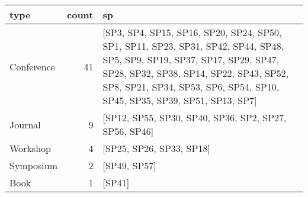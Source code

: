 \begin{tabular}{lrl}
\toprule
       type &  count &                                                                                                                                                                                                                                              sp \\
\midrule
 Conference &     41 &  [SP3, SP4, SP15, SP16, SP20, SP24, SP50, SP1, SP11, SP23, SP31, SP42, SP44, SP48, SP5, SP9, SP19, SP37, SP17, SP29, SP47, SP28, SP32, SP38, SP14, SP22, SP43, SP52, SP8, SP21, SP34, SP53, SP6, SP54, SP10, SP45, SP35, SP39, SP51, SP13, SP7] \\
    Journal &      9 &                                                                                                                                                                                           [SP12, SP55, SP30, SP40, SP36, SP2, SP27, SP56, SP46] \\
   Workshop &      4 &                                                                                                                                                                                                                        [SP25, SP26, SP33, SP18] \\
  Symposium &      2 &                                                                                                                                                                                                                                    [SP49, SP57] \\
       Book &      1 &                                                                                                                                                                                                                                          [SP41] \\
\bottomrule
\end{tabular}
